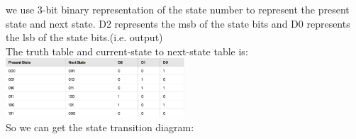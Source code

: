 \documentclass[a4paper]{article}
\begin{document}
\begin{answer}[Question 2]
    we use 3-bit binary representation of the state number to represent the present state and next state. D2 represents the msb of the state bits and D0 represents the lsb of the state bits.(i.e. output)\\
    The truth table and current-state to next-state table is:\\
    \includegraphics[width=0.5\textwidth]{hw4_q2_truth_table.png}
    \\
    So we can get the state transition diagram:\\
\end{answer}
\end{document}

